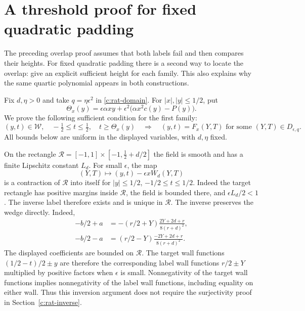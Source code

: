 \section{A threshold proof for fixed quadratic padding}
\label{c:rat-threshold}

The preceding overlap proof assumes that both labels fail and then
compares their heights.  For fixed quadratic padding there is a second
way to locate the overlap: give an explicit sufficient height for each
family.  This also explains why the same quartic polynomial appears in
both constructions.

Fix $d,\eta>0$ and take $q=\eta\epsilon^2$ in
\eqref{c:rat-domain}.  For $|x|,|y|\le1/2$, put
\begin{equation}\label{c:rat-threshold-function}
 \Theta_x(y)=\epsilon\alpha xy
       +\epsilon^2\bigl(\alpha x^2c(y)-P(y)\bigr).
\end{equation}
We prove the following sufficient condition for the first family:
\begin{equation}\label{c:rat-threshold-inclusion}
 (y,t)\in\mathcal W,\quad -\tfrac12\le t\le\tfrac12,
 \quad t\ge\Theta_x(y)
 \quad\Longrightarrow\quad
 (y,t)=F_x(Y,T)\text{ for some }(Y,T)\in D_{\epsilon,q}.
\end{equation}
All bounds below are uniform in the displayed variables, with $d,\eta$
fixed.

On the rectangle
$\mathcal R=[-1,1]\times[-1,\tfrac12+d/2]$ the field is smooth and
has a finite Lipschitz constant $L_d$.  For small $\epsilon$, the map
\[
 (Y,T)\longmapsto (y,t)-\epsilon xW_d(Y,T)
\]
is a contraction of $\mathcal R$ into itself for
$|y|\le1/2$, $-1/2\le t\le1/2$.
Indeed the target rectangle has positive margins inside $\mathcal R$,
the field is bounded there, and $\epsilon L_d/2<1$.
The inverse label therefore exists and is unique in $\mathcal R$.
The inverse preserves the wedge directly.  Indeed,
\begin{align*}
 -b/2+a&=-(r/2+Y)\frac{2Y+2d+r}{8(r+d)^2},\\
 -b/2-a&=(r/2-Y)\frac{-2Y+2d+r}{8(r+d)^2}.
\end{align*}
The displayed coefficients are bounded on $\mathcal R$.  The target wall
functions $(1/2-t)/2\pm y$ are therefore the corresponding label wall
functions $r/2\pm Y$ multiplied by positive factors when $\epsilon$
is small.  Nonnegativity of the target wall functions implies
nonnegativity of the label wall functions, including equality on either
wall.  Thus this inversion argument does not require the surjectivity
proof in Section~\ref{c:rat-inverse}.

